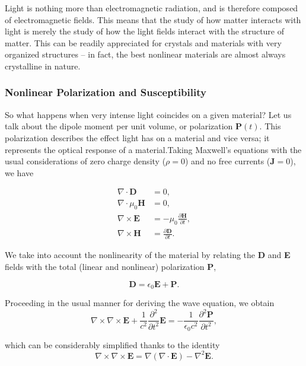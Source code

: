 Light is nothing more than electromagnetic radiation, and is therefore composed of electromagnetic fields. This means that the study of how matter interacts with light is merely the study of how the light fields interact with the structure of matter. This can be readily appreciated for crystals and materials with very organized structures -- in fact, the best nonlinear materials are almost always crystalline in nature.

\subsubsection{Nonlinear Polarization and Susceptibility}
So what happens when very intense light coincides on a given material? Let us talk about the dipole moment per unit volume, or polarization $\mathbf{P}(t)$. This polarization describes the effect light has on a material and vice versa; it represents the optical response of a material.Taking Maxwell's equations with the usual considerations of zero charge density ($\rho=0$) and no free currents ($\mathbf{J}=0$), we have

\begin{align}
\nabla\cdot\mathbf{D} &= 0,\label{eq_max_1}\\
\nabla\cdot\mu_{0}\mathbf{H} &= 0,\\
\nabla\times\mathbf{E} &= -\mu_{0}\frac{\partial\mathbf{H}}{\partial t},\\
\nabla\times\mathbf{H} &= \frac{\partial\mathbf{D}}{\partial t}.
\end{align}

We take into account the nonlinearity of the material by relating the \textbf{D} and \textbf{E} fields with the total (linear and nonlinear) polarization \textbf{P},

\begin{equation}
\mathbf{D} = \epsilon_{0}\mathbf{E} + \mathbf{P}.
\end{equation}

Proceeding in the usual manner for deriving the wave equation, we obtain
\begin{equation}
\nabla\times\nabla\times\mathbf{E} + \frac{1}{c^{2}}\frac{\partial^{2}}{\partial t^{2}}\mathbf{E} = -\frac{1}{\epsilon_{0}c^{2}}\frac{\partial^{2}\mathbf{P}}{\partial t^{2}},
\end{equation}

which can be considerably simplified thanks to the identity
\begin{equation}
\nabla\times\nabla\times\mathbf{E} = \nabla\left(\nabla\cdot\mathbf{E}\right)-\nabla^{2}\mathbf{E}.
\end{equation}

